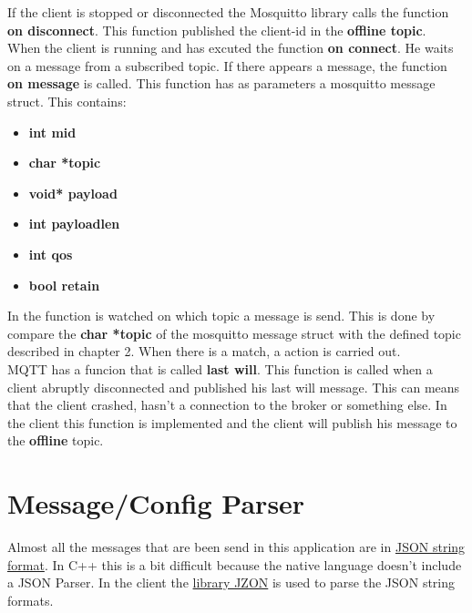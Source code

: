 If the client is stopped or disconnected the Mosquitto library calls the function \textbf {on disconnect}. This function published the client-id in the \textbf {offline topic}.\\

When the client is running and has excuted the function \textbf {on connect}. He waits on a message from a subscribed topic. If there appears a message, the function \textbf {on message} is called. This function has as parameters a mosquitto message struct. This contains: 
\small{
\begin{itemize} [noitemsep, nolistsep]
	\item \textbf {int mid}
	\item \textbf {char *topic}
	\item \textbf {void* payload}
	\item \textbf {int payloadlen}
	\item \textbf {int qos}
	\item \textbf {bool retain\\}
\end{itemize}
}

In the function is watched on which topic a message is send. This is done by compare the \textbf {char *topic} of the mosquitto message struct with the defined topic described in chapter 2. When there is a match, a action is carried out.\\

MQTT has a funcion that is called \textbf {last will}. This function is called when a client abruptly disconnected and published his last will message. This can means that the client crashed, hasn't a connection to the broker or something else. In the client this function is implemented and the client will publish his message to the \textbf {offline} topic.

\section{Message/Config Parser}

Almost all the messages that are been send in this application are in \href{http://www.json.org/}{JSON string format}. In C++ this is a bit difficult because the native language doesn't include a JSON Parser. In the client the \href{https://github.com/Zguy/Jzon}{library JZON} is used to parse the JSON string formats.\\

